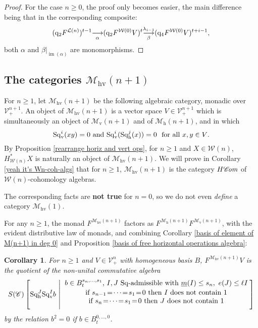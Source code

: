 \documentclass[11pt]{amsart} \renewcommand{\baselinestretch}{1.2}
\theoremstyle{plain}
\newtheorem{cor}[thm]{Corollary}
\numberwithin{equation}{section} %
\theoremstyle{plain}
\newtheorem{cor}[thm]{Corollary}
\numberwithin{equation}{chapter} %
\DeclareMathOperator{\im}{im}
\renewcommand{\to}{\longrightarrow}
\newcommand{\scrC}{\mathscr{C}}
\newcommand{\calV}{\mathcal{V}}
\newcommand{\calw}{\mathcal{W}}
\newcommand{\call}{\mathcal{L}}
\newcommand{\calMv}{\mathcal{M}\dver}
\newcommand{\calMh}{\mathcal{M}\dhor}
\newcommand{\calMhv}{\mathcal{M}_\mathrm{hv}}
\newcommand{\CommOperad}{{\scrC}}
\newcommand{\vect}[2]{\calV^{#1}_{#2}}
\newcommand{\HA}[1]{H#1}
\newcommand{\quadgrad}[1]{\mathrm{q}_{#1}}
\newcommand{\mono}{{\to}}
\newcommand{\minDimSq}{\underline{m}}
\newcommand{\excess}{e}
\newcommand{\Sq}{\mathrm{Sq}}
\newcommand{\algs}{{\scrC\!\textit{\normalfont\textit{om}}}}
\newcommand{\uver}{^\mathrm{v}}
\newcommand{\dver}{_\mathrm{v}}
\newcommand{\dhor}{_\mathrm{h}}
\newcommand{\Sqh}{\mathrm{Sq}\dhor}
\newcommand{\Sqv}{\mathrm{Sq}\dver}
\newcommand{\deltav}{\delta\uver}
\newcommand{\SubsectionOrSection}[1]{\subsection{#1}}
\begin{document}
\begin{Cohomology Operations for W and U}
\begin{proof}
For the case $n\geq0$, the proof only becomes easier, the main difference being that in the corresponding composite:
\[(\quadgrad{2}F^{\call(n)})^{t-1}\underset{\smash{\alpha}}{{\to}} (\quadgrad{2}F^{\calw(0)}V)^{t}\underset{\smash{\beta}}{\overset{\lambda_{i-1}}{\mono}} (\quadgrad{4}F^{\calw(0)}V)^{t+i-1},\]
both $\alpha$ and $\beta|_{\im(\alpha)}$ are monomorphisms.
\end{proof}

\SubsectionOrSection{The categories $\calMhv(n+1)$}
For $n\geq1$, let $\calMhv(n+1)$ be the following algebraic category, monadic over $\vect{n+1}{+}$. An object of $\calMhv(n+1)$ is a vector space $V\in \vect{n+1}{+}$ which is simultaneously an object of $\calMv(n+1)$ and of $\calMh(n+1)$, and in which
\[\Sqv^i(xy)=0\textup{ and }\Sqv^i(\Sqh^j(x))=0\textup{\ \ for all $x,y\in V$}.\]
By Proposition \ref{rearrange horiz and vert ops}, for $n\geq1$ and $X\in\calw(n)$, $H^*_{\calw(n)}X$ is naturally an object of $\calMhv(n+1)$.  We will prove in Corollary \ref{yeah it's Wn-coh-algs} that for $n\geq1$, $\calMhv(n+1)$ is the category $\HA{\algs}$ of $\calw(n)$-cohomology algebras.

The corresponding facts are \textbf{not true} for $n=0$, so we do not even \emph{define} a category $\calMhv(1)$.

For any $n\geq1$, the monad $F^{\calMhv(n+1)}$ factors as $F^{\calMh(n+1)}F^{\calMv(n+1)}$, with the evident distributive law of monads, and combining Corollary \ref{basis of element of M(n+1) in deg 0} and Proposition \ref{basis of free horizontal operations algebra}:
\begin{cor}
\label{calMhv(n+1) description}
For $n\geq1$ and $V\in\vect{n}{+}$ with homogeneous basis $B$,  $F^{\calMhv(n+1)}V$ is the quotient of the non-unital commutative algebra
%
%
%
\[S(\CommOperad) \left[\Sqh^J\Sq\dver^Ib\ \middle|\ \genfrac{}{}{0pt}{}{{\displaystyle\genfrac{}{}{0pt}{}{b\in B^{s_{n},\ldots,s_1}_t\textup{, $I,J$ $\Sq$-admissible with }\minDimSq(I)\leq s_n,\ \excess(J)\leq \ell I}{\textup{if }s_{n-1}\!=\!\cdots\!=\!s_1\!=\!0\textup{ then $I$ does not contain 1}}}}{
\textup{if }s_{n}\!=\!\cdots\!=\!s_1\!=\!0\textup{ then $J$ does not contain 1}
}
\right]\]
by the relation $b^2=0$ if $b\in B_t^{0,\ldots,0}$.
\end{cor}



\end{Cohomology Operations for W and U}
\end{document}
